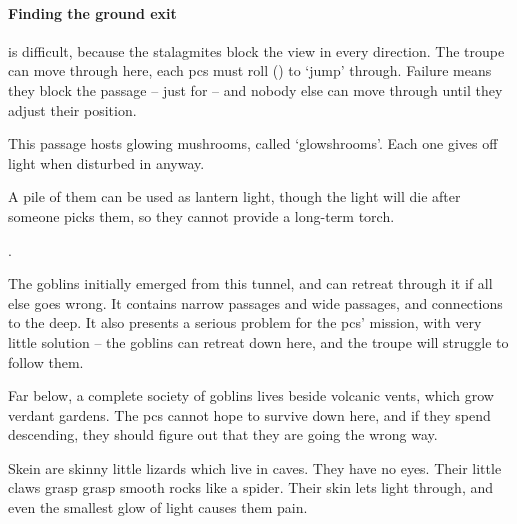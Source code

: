 \begin{multicols}{2}
\paragraph{Finding the ground exit}
is difficult, because the stalagmites block the view in every direction.
The troupe can move through here, each \glspl{pc} must roll  (\tn[10]) to `jump' through.
Failure means they block the passage -- just for  -- and nobody else can move through until they adjust their position.




This passage hosts glowing mushrooms, called `\glspl{glowshroom}'.
Each one gives off light when disturbed in anyway.

A pile of them can be used as lantern light, though the light will die after  someone picks them, so they cannot provide a long-term torch.


.


The goblins initially emerged from this tunnel, and can retreat through it if all else goes wrong.
It contains narrow passages and wide passages, and connections to the \gls{deep}.
It also presents a serious problem for the \glspl{pc}' mission, with very little solution -- the goblins can retreat down here, and the troupe will struggle to follow them.

Far below, a complete society of goblins lives beside volcanic vents, which grow verdant gardens.
The \glspl{pc} cannot hope to survive down here, and if they spend  descending, they should figure out that they are going the wrong way.


\begin{exampletext}
  Skein are skinny little lizards which live in caves.
  They have no eyes.
  Their little claws grasp grasp smooth rocks like a spider.
  Their skin lets light through, and even the smallest glow of light causes them pain.
\end{exampletext}


\end{multicols}
